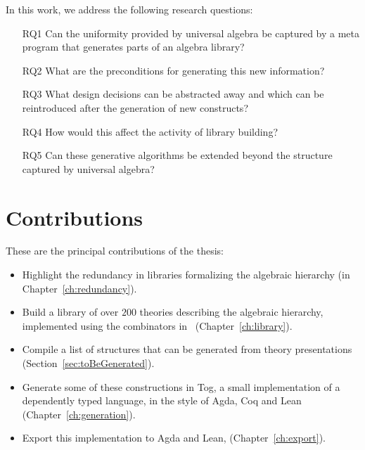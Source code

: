 In this work, we address the following research questions: 
\begin{enumerate}
    \item[RQ1] Can the uniformity provided by universal algebra be captured by a meta program that generates parts of an algebra library? 
    \item[RQ2] What are the preconditions for generating this new information? 
    \item[RQ3] What design decisions can be abstracted away and which can be reintroduced after the generation of new constructs?
    \item[RQ4] How would this affect the activity of library building?
    \item[RQ5] Can these generative algorithms be extended beyond the structure captured by universal algebra? 
\end{enumerate}

\section{Contributions}
These are the principal contributions of the thesis: 
\begin{itemize}
    \item Highlight the redundancy in libraries formalizing the algebraic hierarchy (in Chapter~\ref{ch:redundancy}). 
    \item Build a library of over $200$ theories describing the algebraic hierarchy, implemented using the combinators in~\cite{carette2018building} (Chapter~\ref{ch:library}). 
    \item Compile a list of structures that can be generated from theory presentations (Section~\ref{sec:toBeGenerated}). 
    \item Generate some of these constructions in Tog, a small implementation of a dependently typed language, in the style of Agda, Coq and Lean (Chapter~\ref{ch:generation}). 
    \item Export this implementation to Agda and Lean, (Chapter~\ref{ch:export}). 
\end{itemize}  

